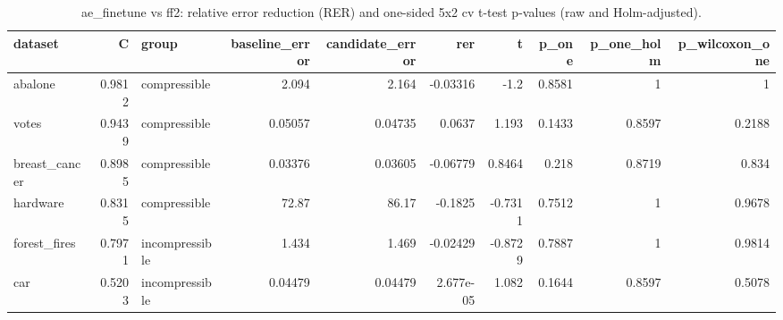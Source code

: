 \begin{table}
\caption{ae_finetune vs ff2: relative error reduction (RER) and one-sided 5x2 cv t-test p-values (raw and Holm-adjusted).}
\label{tab:hypothesis}
\begin{tabular}{lrlrrrrrrr}
\toprule
dataset & C & group & baseline\_error & candidate\_error & rer & t & p\_one & p\_one\_holm & p\_wilcoxon\_one \\
\midrule
abalone & 0.9812 & compressible & 2.094 & 2.164 & -0.03316 & -1.2 & 0.8581 & 1 & 1 \\
votes & 0.9439 & compressible & 0.05057 & 0.04735 & 0.0637 & 1.193 & 0.1433 & 0.8597 & 0.2188 \\
breast\_cancer & 0.8985 & compressible & 0.03376 & 0.03605 & -0.06779 & 0.8464 & 0.218 & 0.8719 & 0.834 \\
hardware & 0.8315 & compressible & 72.87 & 86.17 & -0.1825 & -0.7311 & 0.7512 & 1 & 0.9678 \\
forest\_fires & 0.7971 & incompressible & 1.434 & 1.469 & -0.02429 & -0.8729 & 0.7887 & 1 & 0.9814 \\
car & 0.5203 & incompressible & 0.04479 & 0.04479 & 2.677e-05 & 1.082 & 0.1644 & 0.8597 & 0.5078 \\
\bottomrule
\end{tabular}
\end{table}
